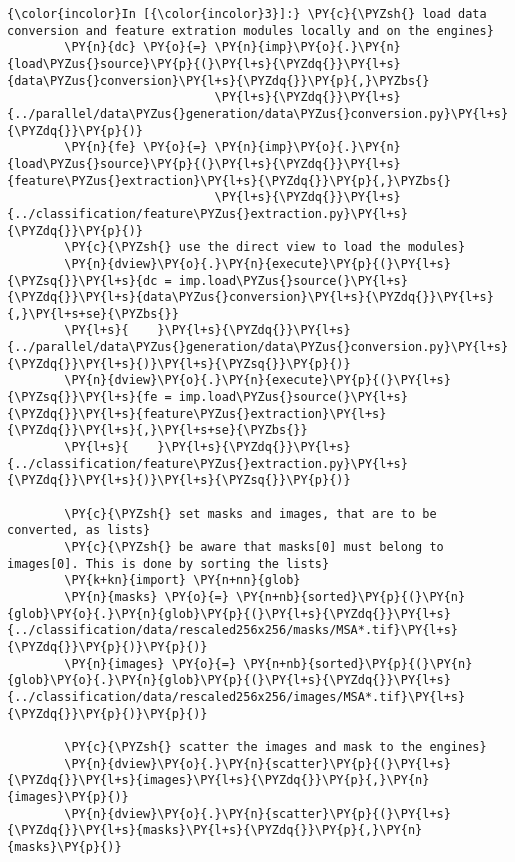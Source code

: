     \begin{Verbatim}[commandchars=\\\{\}]
{\color{incolor}In [{\color{incolor}3}]:} \PY{c}{\PYZsh{} load data conversion and feature extration modules locally and on the engines}
        \PY{n}{dc} \PY{o}{=} \PY{n}{imp}\PY{o}{.}\PY{n}{load\PYZus{}source}\PY{p}{(}\PY{l+s}{\PYZdq{}}\PY{l+s}{data\PYZus{}conversion}\PY{l+s}{\PYZdq{}}\PY{p}{,}\PYZbs{}
                             \PY{l+s}{\PYZdq{}}\PY{l+s}{../parallel/data\PYZus{}generation/data\PYZus{}conversion.py}\PY{l+s}{\PYZdq{}}\PY{p}{)}
        \PY{n}{fe} \PY{o}{=} \PY{n}{imp}\PY{o}{.}\PY{n}{load\PYZus{}source}\PY{p}{(}\PY{l+s}{\PYZdq{}}\PY{l+s}{feature\PYZus{}extraction}\PY{l+s}{\PYZdq{}}\PY{p}{,}\PYZbs{}
                             \PY{l+s}{\PYZdq{}}\PY{l+s}{../classification/feature\PYZus{}extraction.py}\PY{l+s}{\PYZdq{}}\PY{p}{)}
        \PY{c}{\PYZsh{} use the direct view to load the modules}
        \PY{n}{dview}\PY{o}{.}\PY{n}{execute}\PY{p}{(}\PY{l+s}{\PYZsq{}}\PY{l+s}{dc = imp.load\PYZus{}source(}\PY{l+s}{\PYZdq{}}\PY{l+s}{data\PYZus{}conversion}\PY{l+s}{\PYZdq{}}\PY{l+s}{,}\PY{l+s+se}{\PYZbs{}}
        \PY{l+s}{    }\PY{l+s}{\PYZdq{}}\PY{l+s}{../parallel/data\PYZus{}generation/data\PYZus{}conversion.py}\PY{l+s}{\PYZdq{}}\PY{l+s}{)}\PY{l+s}{\PYZsq{}}\PY{p}{)}
        \PY{n}{dview}\PY{o}{.}\PY{n}{execute}\PY{p}{(}\PY{l+s}{\PYZsq{}}\PY{l+s}{fe = imp.load\PYZus{}source(}\PY{l+s}{\PYZdq{}}\PY{l+s}{feature\PYZus{}extraction}\PY{l+s}{\PYZdq{}}\PY{l+s}{,}\PY{l+s+se}{\PYZbs{}}
        \PY{l+s}{    }\PY{l+s}{\PYZdq{}}\PY{l+s}{../classification/feature\PYZus{}extraction.py}\PY{l+s}{\PYZdq{}}\PY{l+s}{)}\PY{l+s}{\PYZsq{}}\PY{p}{)}
        
        \PY{c}{\PYZsh{} set masks and images, that are to be converted, as lists}
        \PY{c}{\PYZsh{} be aware that masks[0] must belong to images[0]. This is done by sorting the lists}
        \PY{k+kn}{import} \PY{n+nn}{glob}
        \PY{n}{masks} \PY{o}{=} \PY{n+nb}{sorted}\PY{p}{(}\PY{n}{glob}\PY{o}{.}\PY{n}{glob}\PY{p}{(}\PY{l+s}{\PYZdq{}}\PY{l+s}{../classification/data/rescaled256x256/masks/MSA*.tif}\PY{l+s}{\PYZdq{}}\PY{p}{)}\PY{p}{)}
        \PY{n}{images} \PY{o}{=} \PY{n+nb}{sorted}\PY{p}{(}\PY{n}{glob}\PY{o}{.}\PY{n}{glob}\PY{p}{(}\PY{l+s}{\PYZdq{}}\PY{l+s}{../classification/data/rescaled256x256/images/MSA*.tif}\PY{l+s}{\PYZdq{}}\PY{p}{)}\PY{p}{)}
        
        \PY{c}{\PYZsh{} scatter the images and mask to the engines}
        \PY{n}{dview}\PY{o}{.}\PY{n}{scatter}\PY{p}{(}\PY{l+s}{\PYZdq{}}\PY{l+s}{images}\PY{l+s}{\PYZdq{}}\PY{p}{,}\PY{n}{images}\PY{p}{)}
        \PY{n}{dview}\PY{o}{.}\PY{n}{scatter}\PY{p}{(}\PY{l+s}{\PYZdq{}}\PY{l+s}{masks}\PY{l+s}{\PYZdq{}}\PY{p}{,}\PY{n}{masks}\PY{p}{)}
        

\end{Verbatim}
